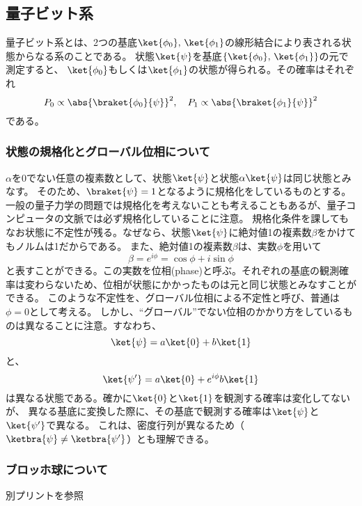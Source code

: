 \documentclass[a4paper,11pt,uplatex]{jsarticle}%
\begin{document}
\subsection{量子ビット系}
量子ビット系とは、2つの基底$\ket{\phi_0},\,\ket{\phi_1}$の線形結合により表される状態からなる系のことである。
状態$\ket{\psi}$を基底$\{\ket{\phi_0},\,\ket{\phi_1}\}$の元で測定すると、
$\ket{\phi_0}$もしくは$\ket{\phi_1}$の状態が得られる。その確率はそれぞれ
\begin{equation}
  P_0 \propto \abs{\braket{\phi_0}{\psi}}^2,\quad P_1 \propto \abs{\braket{\phi_1}{\psi}}^2
\end{equation}
である。
\subsubsection{状態の規格化とグローバル位相について}
$\alpha$を$0$でない任意の複素数として、状態$\ket{\psi}$と状態$\alpha\ket{\psi}$は同じ状態とみなす。
そのため、$\braket{\psi}=1$となるように規格化をしているものとする。
一般の量子力学の問題では規格化を考えないことも考えることもあるが、量子コンピュータの文脈では必ず規格化していることに注意。
規格化条件を課してもなお状態に不定性が残る。なぜなら、状態$\ket{\psi}$に絶対値1の複素数$\beta$をかけてもノルムは1だからである。
また、絶対値1の複素数$\beta$は、実数$\phi$を用いて
\begin{equation}
  \beta=e^{i\phi} = \cos\phi+i\sin\phi
\end{equation}
と表すことができる。この実数を位相(phase)と呼ぶ。それぞれの基底の観測確率は変わらないため、位相が状態にかかったものは元と同じ状態とみなすことができる。
このような不定性を、グローバル位相による不定性と呼び、普通は$\phi=0$として考える。
しかし、``グローバル''でない位相のかかり方をしているものは異なることに注意。すなわち、
\begin{equation}
  \ket{\psi}=a\ket{0}+b\ket{1}
\end{equation}
と、
\begin{equation}
  \ket{\psi'}=a\ket{0}+e^{i\phi}b\ket{1}
\end{equation}
は異なる状態である。確かに$\ket{0}$と$\ket{1}$を観測する確率は変化してないが、
異なる基底に変換した際に、その基底で観測する確率は$\ket{\psi}$と$\ket{\psi'}$で異なる。
これは、密度行列が異なるため（$\ketbra{\psi}\neq\ketbra{\psi'}$）とも理解できる。

\subsubsection{ブロッホ球について}
別プリントを参照
\end{document}
